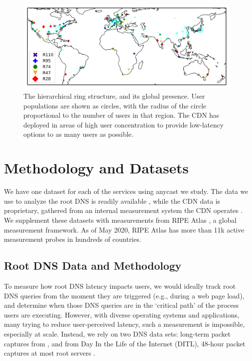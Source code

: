 \documentclass[sigconf,letterpaper,nonacm,10pt,anonymous]{acmart}
\begin{document}
\begin{figure}
    \centering
    \includegraphics[width=\linewidth]{figures/microsoft_deployment_map.pdf}
    \caption{The hierarchical ring structure, and its global presence. User populations are shown as circles, with the radius of the circle proportional to the number of users in that region. The CDN has deployed \feplural in areas of high user concentration to provide low-latency options to as many users as possible.}
    \label{fig:microsoft_deployment_map}
\end{figure}

\section{Methodology and Datasets}\label{methodology-and-datasets-1}

\label{sec:methodology_datasets}

We have one dataset for each of the services using anycast we study. The
data we use to analyze the root DNS is readily available \cite{ditl},
while the CDN data is proprietary, gathered from an internal measurement
system the CDN operates . We supplement these datasets with measurements
from RIPE Atlas \cite{staff2015ripe}, a global measurement framework. As
of May 2020, RIPE Atlas has more than 11k active measurement probes in
hundreds of countries.

\subsection{Root DNS Data and
Methodology}\label{root-dns-data-and-methodology-1}

\label{sec:root_dns_data_sources}

To measure how root DNS latency impacts users, we would ideally track
root DNS queries from the moment they are triggered (e.g., during a web
page load), and determine when those DNS queries are in the `critical
path' of the process users are executing. However, with diverse
operating systems and applications, many trying to reduce user-perceived
latency, such a measurement is impossible, especially at scale. Instead,
we rely on two DNS data sets: long-term packet captures from \ISIone,
and from Day In the Life of the Internet (DITL), 48-hour packet captures
at most root servers \cite{ditl}.
\end{document}
